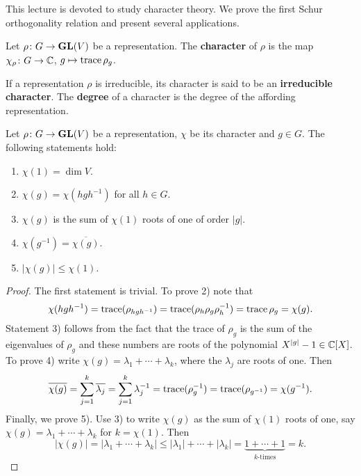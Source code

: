 \chapter{}


This lecture is devoted to study character theory. We prove
the first Schur orthogonality relation and present 
several applications.

\begin{definition}
	Let $\rho\colon G\to\mathbf{GL}(V)$ be a representation. The \textbf{character} of $\rho$ 
	is the map $\chi_\rho\colon G\to\mathbb{C}$, $g\mapsto\operatorname{trace}\rho_g$. 	
\end{definition}

If a representation $\rho$ is irreducible, its character is said to be an 
\textbf{irreducible character}. The \textbf{degree} of a character is the degree of the affording
representation. 

\begin{proposition}
	Let $\rho\colon G\to\mathbf{GL}(V)$ be a representation, $\chi$ be its character and $g\in G$.
	The following statements hold:
	\begin{enumerate}
		\item $\chi(1)=\dim V$. 
		\item $\chi(g)=\chi(hgh^{-1})$ for all $h\in G$.
		\item $\chi(g)$ is the sum of $\chi(1)$ roots of one of order $|g|$. 
		\item $\chi(g^{-1})=\overline{\chi(g)}$. 
		\item $|\chi(g)|\leq\chi(1)$.  
	\end{enumerate} 
\end{proposition}

\begin{proof}
	The first statement is trivial. 	To prove 2) note that
	\[
	\chi(hgh^{-1})=\operatorname{trace}(\rho_{hgh^{-1}})=\operatorname{trace}(\rho_h\rho_g\rho_h^{-1})=\operatorname{trace}\rho_g=\chi(g).
	\]
	Statement 3) follows from the fact that the trace of $\rho_g$ is the sum
	of the eigenvalues of $\rho_g$ and these numbers are roots of the polynomial
	$X^{|g|}-1\in\mathbb{C}[X]$. To prove 4) write $\chi(g)=\lambda_1+\cdots+\lambda_k$, where 
	the $\lambda_j$ are roots of one. Then
	\[
	\overline{\chi(g)}=\sum^k_{j=1}\overline{\lambda_j}
	=\sum_{j=1}^k\lambda_j^{-1}
	=\operatorname{trace}(\rho_g^{-1})
	=\operatorname{trace}(\rho_{g^{-1}})
	=\chi(g^{-1}).
	\] 
	Finally, we prove 5). Use 3) to write $\chi(g)$ as the sum of
	$\chi(1)$ roots of one, say $\chi(g)=\lambda_1+\cdots+\lambda_k$ for
	$k=\chi(1)$. Then 
	\[
	|\chi(g)|=|\lambda_1+\cdots+\lambda_k|\leq |\lambda_1|+\cdots+|\lambda_k|
	=\underbrace{1+\cdots+1}_{\text{$k$-times}}=k.
	\]
\end{proof}

